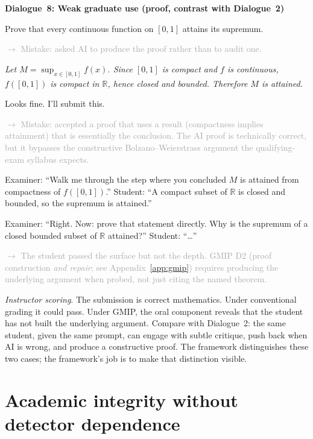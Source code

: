 \documentclass{SIAMbook2023}
\newenvironment{dialogue}[1]%
  {\par\medskip\noindent\textbf{\textcolor{guideblue}{#1}}\par\smallskip
   \begin{list}{}{\setlength{\leftmargin}{1.5em}\setlength{\rightmargin}{0.5em}\setlength{\itemsep}{0.4em}\setlength{\topsep}{0pt}}}
  {\end{list}\par\medskip}
\newcommand{\studentturn}[1]{\item[\textbf{Student.}] #1}
\newcommand{\aiturn}[1]{\item[\textbf{AI.}] \textit{#1}}
\newcommand{\dialogueannotate}[1]{\par\smallskip\hspace{2em}\textcolor{darkgray}{\footnotesize\textsf{$\rightarrow$ #1}}\par}
\begin{document}
\begin{dialogue}{Dialogue~8: Weak graduate use (proof, contrast with Dialogue~2)}
\studentturn{Prove that every continuous function on $[0,1]$ attains its supremum.}
\dialogueannotate{Mistake: asked AI to produce the proof rather than to audit one.}

\aiturn{Let $M = \sup_{x \in [0,1]} f(x)$. Since $[0,1]$ is compact and $f$ is continuous, $f([0,1])$ is compact in $\mathbb{R}$, hence closed and bounded. Therefore $M$ is attained.}

\studentturn{Looks fine. I'll submit this.}
\dialogueannotate{Mistake: accepted a proof that uses a result (compactness implies attainment) that is essentially the conclusion. The AI proof is technically correct, but it bypasses the constructive Bolzano--Weierstrass argument the qualifying-exam syllabus expects.}

\studentturn{[Oral examination.] Examiner: ``Walk me through the step where you concluded $M$ is attained from compactness of $f([0,1])$.'' Student: ``A compact subset of $\mathbb{R}$ is closed and bounded, so the supremum is attained.''}

\studentturn{Examiner: ``Right. Now: prove that statement directly. Why is the supremum of a closed bounded subset of $\mathbb{R}$ attained?'' Student: ``\dots''}
\dialogueannotate{The student passed the surface but not the depth. GMIP D2 (proof construction \emph{and repair}; see Appendix~\ref{app:gmip}) requires producing the underlying argument when probed, not just citing the named theorem.}
\end{dialogue}

\noindent\textit{Instructor scoring}. The submission is correct mathematics. Under conventional grading it could pass. Under GMIP, the oral component reveals that the student has not built the underlying argument. Compare with Dialogue~2: the same student, given the same prompt, can engage with subtle critique, push back when AI is wrong, and produce a constructive proof. The framework distinguishes these two cases; the framework's job is to make that distinction visible.

\section{Academic integrity without detector dependence}
\label{i:sec:integrity}%
\end{document}
